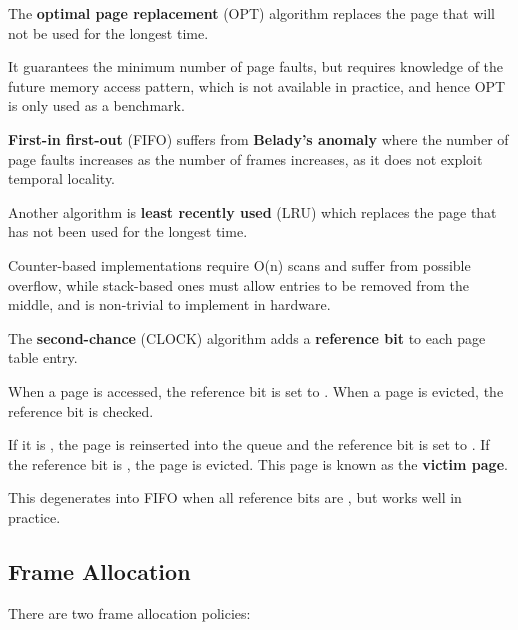 The \textbf{optimal page replacement} (OPT) algorithm replaces the page that will not be used for the longest time.

It guarantees the minimum number of page faults, but requires knowledge of the future memory access pattern, which is not available in practice, and hence OPT is only used as a benchmark.

\textbf{First-in first-out} (FIFO) suffers from \textbf{Belady's anomaly} where the number of page faults increases as the number of frames increases, as it does not exploit temporal locality.

Another algorithm is \textbf{least recently used} (LRU) which replaces the page that has not been used for the longest time.

Counter-based implementations require O(n) scans and suffer from possible overflow, while stack-based ones must allow entries to be removed from the middle, and is non-trivial to implement in hardware.

The \textbf{second-chance} (CLOCK) algorithm adds a \textbf{reference bit} to each page table entry.

When a page is accessed, the reference bit is set to .
When a page is evicted, the reference bit is checked.

If it is , the page is reinserted into the queue and the reference bit is set to .
If the reference bit is , the page is evicted. This page is known as the \textbf{victim page}.

This degenerates into FIFO when all reference bits are , but works well in practice.


\subsection{Frame Allocation}
There are two frame allocation policies:
\begin{enumerate}
\end{enumerate}

